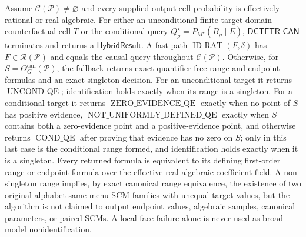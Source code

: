 Assume \(\mathcal C(\mathcal P)\ne\varnothing\) and every supplied output-cell probability is effectively rational or real algebraic.  For either an unconditional finite target-domain counterfactual cell \(T\) or the conditional query \(Q_\rho^\star=P_{M^\star}(B_\rho\mid E)\), \(\mathsf{DCTFTR\text{-}CAN}\) terminates and returns a \(\mathsf{HybridResult}\).  A fast-path \(\operatorname{ID\_RAT}(F,\delta)\) has \(F\in\mathscr R(\mathcal P)\) and equals the causal query throughout \(\mathcal C(\mathcal P)\).  Otherwise, for \(S=\Theta_G^{\mathrm{can}}(\mathcal P)\), the fallback returns exact quantifier-free range and endpoint formulas and an exact singleton decision.  For an unconditional target it returns \(\operatorname{UNCOND\_QE}\); identification holds exactly when its range is a singleton.  For a conditional target it returns \(\operatorname{ZERO\_EVIDENCE\_QE}\) exactly when no point of \(S\) has positive evidence, \(\operatorname{NOT\_UNIFORMLY\_DEFINED\_QE}\) exactly when \(S\) contains both a zero-evidence point and a positive-evidence point, and otherwise returns \(\operatorname{COND\_QE}\) after proving that evidence has no zero on \(S\); only in this last case is the conditional range formed, and identification holds exactly when it is a singleton.  Every returned formula is equivalent to its defining first-order range or endpoint formula over the effective real-algebraic coefficient field.  A non-singleton range implies, by exact canonical range equivalence, the existence of two original-alphabet same-menu SCM families with unequal target values, but the algorithm is not claimed to output endpoint values, algebraic samples, canonical parameters, or paired SCMs.  A local face failure alone is never used as broad-model nonidentification.